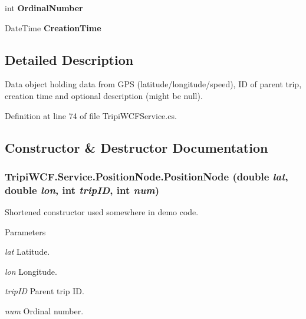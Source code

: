 \begin{DoxyCompactItemize}
\item 
\hypertarget{class_tripi_w_c_f_1_1_service_1_1_position_node_a76bd3433903f76dd48067a1733857c4d}{
int {\bfseries OrdinalNumber}}
\label{class_tripi_w_c_f_1_1_service_1_1_position_node_a76bd3433903f76dd48067a1733857c4d}

\item 
\hypertarget{class_tripi_w_c_f_1_1_service_1_1_position_node_a191e67c7a5bfa2cec148977b3f167599}{
DateTime {\bfseries CreationTime}}
\label{class_tripi_w_c_f_1_1_service_1_1_position_node_a191e67c7a5bfa2cec148977b3f167599}

\end{DoxyCompactItemize}


\subsection{Detailed Description}
Data object holding data from GPS (latitude/longitude/speed), ID of parent trip, creation time and optional description (might be null). 

Definition at line 74 of file TripiWCFService.cs.

\subsection{Constructor \& Destructor Documentation}
\hypertarget{class_tripi_w_c_f_1_1_service_1_1_position_node_a64485324d09216250cfeed79c7987ce7}{
\subsubsection[{PositionNode}]{\setlength{\rightskip}{0pt plus 5cm}TripiWCF.Service.PositionNode.PositionNode (double {\em lat}, \/  double {\em lon}, \/  int {\em tripID}, \/  int {\em num})}}
\label{class_tripi_w_c_f_1_1_service_1_1_position_node_a64485324d09216250cfeed79c7987ce7}


Shortened constructor used somewhere in demo code. 
\begin{DoxyParams}{Parameters}
\item[{\em lat}]Latitude.\item[{\em lon}]Longitude.\item[{\em tripID}]Parent trip ID.\item[{\em num}]Ordinal number.\end{DoxyParams}


